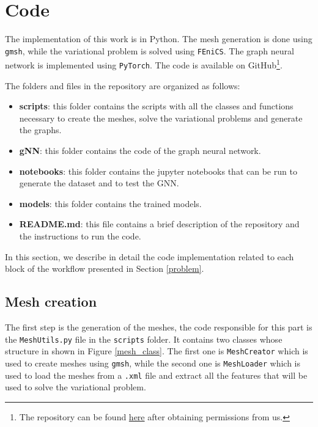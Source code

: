 \documentclass[11pt,a4paper]{article}
\begin{document}
\section{Code}

The implementation of this work is in Python. The mesh generation is done using \texttt{gmsh}, while the variational problem is solved using \texttt{FEniCS}. The graph neural network is implemented using \texttt{PyTorch}. The code is available on GitHub\footnote{The repository can be found \href{https://github.com/itsmebonny/pacsproj}{here} after obtaining permissions from us.}.

\noindent
The folders and files in the repository are organized as follows:
\medskip
\begin{itemize}
    \item[\faFolder] \textbf{scripts}: this folder contains the scripts with all the classes and functions necessary to create the meshes, solve the variational problems and generate the graphs. 
    \medskip
    \item[\faFolder] \textbf{gNN}: this folder contains the code of the graph neural network.
    \medskip
    \item[\faFolder] \textbf{notebooks}: this folder contains the jupyter notebooks that can be run to generate the dataset and to test the GNN.
    \medskip
    \item[\faFolder] \textbf{models}: this folder contains the trained models.
    \medskip
    \item[\faFileO] \textbf{README.md}: this file contains a brief description of the repository and the instructions to run the code.
\end{itemize}

In this section, we describe in detail the code implementation related to each block of the workflow presented in Section \ref{problem}.

\subsection{Mesh creation}

The first step is the generation of the meshes, the code responsible for this part is the \texttt{MeshUtils.py} file in the \texttt{scripts} folder.
It contains two classes whose structure in shown in Figure \ref{mesh_class}. The first one is \texttt{MeshCreator} which is used to create meshes using \texttt{gmsh}, while the second one is  \texttt{MeshLoader} which is used to load the meshes from a \texttt{.xml} file and extract all the features that will be used to solve the variational problem.
\end{document}
